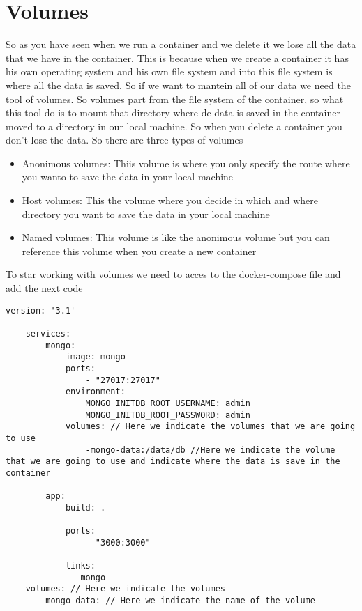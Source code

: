 \documentclass{article}
\begin{document}
\section*{Volumes}
So as you have seen when we run a container and we delete it we lose all the data that we have in the container. This is because
when we create a container it has his own operating system and his own file system and into this file system is where all the data 
is saved. So if we want to mantein all of our data we need the tool of volumes. So volumes part from the file system of the container, 
so what this tool do is to mount that directory where de data is saved in the container moved to a directory in our local machine.
So when you delete a container you don't lose the data. So there are three types of volumes 
\begin{itemize}
    \item Anonimous volumes: Thiis volume is where you only specify the route where you wanto to save the data in your local machine 
    \item Host volumes: This the volume where you decide in which and where directory you want to save the data in your local machine
    \item Named volumes: This volume is like the anonimous volume but you can reference this volume when you create a new container 
\end{itemize}

To star working with volumes we need to acces to the docker-compose file and add the next code
\begin{lstlisting}[breaklines=true, breakatwhitespace=true]
    version: '3.1' 

    services: 
        mongo: 
            image: mongo 
            ports:
                - "27017:27017"
            environment: 
                MONGO_INITDB_ROOT_USERNAME: admin
                MONGO_INITDB_ROOT_PASSWORD: admin
            volumes: // Here we indicate the volumes that we are going to use
                -mongo-data:/data/db //Here we indicate the volume that we are going to use and indicate where the data is save in the container
         
        app:
            build: . 

            ports:
                - "3000:3000"
            
            links: 
             - mongo
    volumes: // Here we indicate the volumes 
        mongo-data: // Here we indicate the name of the volume
\end{lstlisting}
\end{document}
